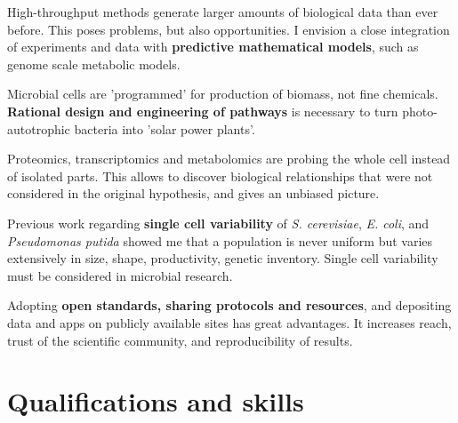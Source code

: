 \documentclass[11pt, a4paper, sans, blue]{moderncv}
\begin{document}
{High-throughput methods generate larger amounts of biological data than ever before. This poses problems, but also opportunities. I envision a close integration of experiments and data with \textbf{predictive mathematical models}, such as genome scale metabolic models.}

{Microbial cells are 'programmed' for production of biomass, not fine chemicals. \textbf{Rational design and engineering of pathways} is necessary to turn photo-autotrophic bacteria into 'solar power plants'.}

{Proteomics, transcriptomics and metabolomics are probing the whole cell instead of isolated parts. This allows to discover biological relationships that were not considered in the original hypothesis, and gives an unbiased picture.}

{Previous work regarding \textbf{single cell variability} of \textit{S. cerevisiae}, \textit{E. coli}, and \textit{Pseudomonas putida} showed me that a population is never uniform but varies extensively in size, shape, productivity, genetic inventory. Single cell variability must be considered in microbial research.}

{Adopting \textbf{open standards, sharing protocols and resources}, and depositing data and apps on publicly available sites has great advantages. It increases reach, trust of the scientific community, and reproducibility of results.}


\section{Qualifications and skills}
	
	
\end{document}
